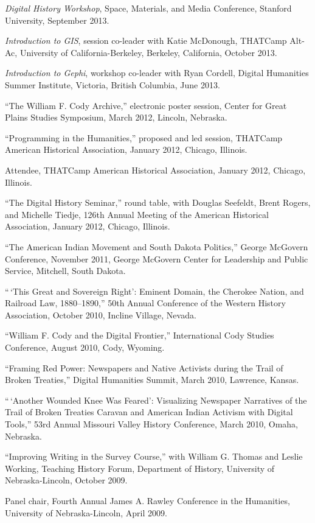 \emph{Digital History Workshop}, Space, Materials, and Media Conference,
Stanford University, September 2013.

\emph{Introduction to GIS}, session co-leader with Katie McDonough,
THATCamp Alt-Ac, University of California-Berkeley, Berkeley,
California, October 2013.

\emph{Introduction to Gephi}, workshop co-leader with Ryan Cordell,
Digital Humanities Summer Institute, Victoria, British Columbia, June
2013.

``The William F. Cody Archive,'' electronic poster session, Center for
Great Plains Studies Symposium, March 2012, Lincoln, Nebraska.

``Programming in the Humanities,'' proposed and led session, THATCamp
American Historical Association, January 2012, Chicago, Illinois.

Attendee, THATCamp American Historical Association, January 2012,
Chicago, Illinois.

``The Digital History Seminar,'' round table, with Douglas Seefeldt,
Brent Rogers, and Michelle Tiedje, 126th Annual Meeting of the American
Historical Association, January 2012, Chicago, Illinois.

``The American Indian Movement and South Dakota Politics,'' George
McGovern Conference, November 2011, George McGovern Center for
Leadership and Public Service, Mitchell, South Dakota.

``\,`This Great and Sovereign Right': Eminent Domain, the Cherokee
Nation, and Railroad Law, 1880--1890,'' 50th Annual Conference of the
Western History Association, October 2010, Incline Village, Nevada.

``William F. Cody and the Digital Frontier,'' International Cody Studies
Conference, August 2010, Cody, Wyoming.

``Framing Red Power: Newspapers and Native Activists during the Trail of
Broken Treaties,'' Digital Humanities Summit, March 2010, Lawrence,
Kansas.

``\,`Another Wounded Knee Was Feared': Visualizing Newspaper Narratives
of the Trail of Broken Treaties Caravan and American Indian Activism
with Digital Tools,'' 53rd Annual Missouri Valley History Conference,
March 2010, Omaha, Nebraska.

``Improving Writing in the Survey Course,'' with William G. Thomas and
Leslie Working, Teaching History Forum, Department of History,
University of Nebraska-Lincoln, October 2009.

Panel chair, Fourth Annual James A. Rawley Conference in the Humanities,
University of Nebraska-Lincoln, April 2009.

